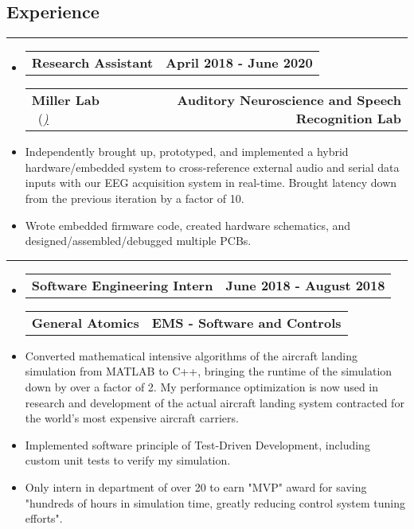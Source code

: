 \documentclass[10pt,letterpaper]{article}
\makeatletter
\newcommand{\items}[2]
{
	\begin{tabular*}{\linewidth}{l @{\extracolsep{\fill}} r}
		#1 & #2 \\
	\end{tabular*}
}
\newcommand{\sectionbreak}
{
	\vspace{-1.2em}
	\rule{\textwidth}{1.7pt}
	\vspace{-1.7em}
}
\makeatother
\begin{document}
\vspace{-1.5em}

\subsection*{Experience}
\sectionbreak



\begin{itemize}
	\item[]
		\items
			{\textbf{Research Assistant}} 
			{\textbf{April 2018 - June 2020}}
		\items
		{\textbf{Miller Lab} \ (\href{https://millerlab.faculty.ucdavis.edu}{\small \emph{\underline{\smash{millerlab.faculty.ucdavis.edu})}}} }
			{\textbf{Auditory Neuroscience and Speech Recognition Lab}} 
		\item
			Independently brought up, prototyped, and implemented a hybrid hardware/embedded system to cross-reference external audio and serial data inputs with our EEG acquisition system in real-time. Brought latency down from the previous iteration by a factor of 10.
		\item
			Wrote embedded firmware code, created hardware schematics, and designed/assembled/debugged multiple PCBs. 
\end{itemize}

\hrule

\begin{itemize}
	\item[]
		\items
			{\textbf{Software Engineering Intern}} 
			{\textbf{June 2018 - August 2018}}
		\items
			{\textbf{General Atomics}}
			{\textbf{EMS - Software and Controls}} 
		\item
			Converted mathematical intensive algorithms of the aircraft landing simulation from MATLAB to C++, bringing the runtime of the simulation down by over a factor of 2. My performance optimization is now used in research and development of the actual aircraft landing system contracted for the world’s most expensive aircraft carriers.
		\item
			Implemented software principle of Test-Driven Development, including custom unit tests to verify my simulation. 
		\item
			Only intern in department of over 20 to earn "MVP" award for saving "hundreds of hours in simulation time, greatly reducing control system tuning efforts".

\end{itemize}

\vspace{-1.5em}
\end{document}
